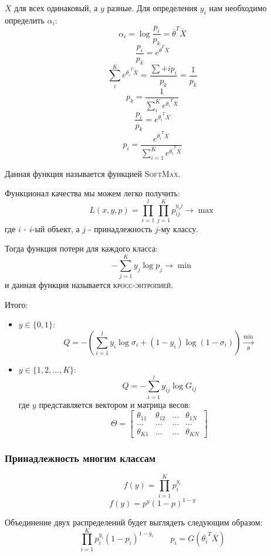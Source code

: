 \documentclass[%
10pt, %
final, %
oneside, %
onecolumn, %
centertags]{article} %
\theoremstyle{plain}
\theoremstyle{definition}
\theoremstyle{remark}
\begin{document}
$X$ для всех одинаковый, а $y$ разные. Для определения $y_i$ нам необходимо определить $\alpha_i$:
$$\alpha_i = \log \frac{p_i}{p_k} = \overline{\theta}^T \overline{X}$$
$$\frac{p_i}{p_k} = e^{\overline{\theta}^T \overline{X}}$$
$$\sum\limits_i^K e^{\overline{\theta_i}^T \overline{X}} = \frac{\sum\limits+i p_i}{p_k} = \frac{1}{p_k}$$
$$p_k= \frac{1}{\sum\limits_i^K e^{\overline{\theta_i}^T \overline{X}}}$$
$$\frac{p_i}{p_k} = e^{\overline{\theta_i}^T \overline{X}}$$
$$p_i = \frac{e^{\overline{\theta_i}^T \overline{X}}}{\sum\limits_{i=1}^K e^{\overline{\theta_i}^T \overline{X}}}$$

Данная функция называется функцией \textsc{SoftMax}.

Функционал качества мы можем легко получить:
$$L(x,y,p) = \prod\limits_{i=1}^l \prod\limits_{j=1}^K p_{ij}^{y_ij} \to \max$$
где $i$ - $i$-ый объект, а $j$ - принадлежность $j$-му классу.

Тогда функция потери для каждого класса:
$$-\sum\limits_{j=1}^K y_j \log p_j \to \min$$
и данная функция называется \textsc{кросс-энтропией}.

Итого:
\begin{itemize}
	\item $y \in \{0,1\}$:
	$$Q = -\left(\sum\limits_{i=1}^l y_i \log \sigma_i + (1-y_i) \log(1-\sigma_i)\right) \xrightarrow[\theta]{\min}$$
	\item $y \in \{1,2,\ldots,K\}$:
	$$Q = - \sum\limits_{i=1}^{l} y_{ij}\log G_{ij}$$
	где $y$ представляется вектором и матрица весов:
	$$\Theta = \begin{bmatrix}
		\theta_{11} & \theta_{12} & \ldots & \theta_{1N}\\
		\ldots & \ldots & \ldots & \ldots \\
		\theta_{K1} & \ldots & \ldots & \theta_{KN}
	\end{bmatrix}$$
\end{itemize}

\subsubsection{Принадлежность многим классам}

$$f(y) = \prod\limits_{i=1}^K p_i^{y_i}$$
$$f(y) = p^y(1-p)^{1-y}$$

Объединение двух распределений будет выглядеть следующим образом:
$$\prod\limits_{i=1}^K p_i^{y_i}(1-p_i)^{1-y_i} \qquad p_i = G(\overline{\theta_i}^T \overline{X})$$
\end{document}
